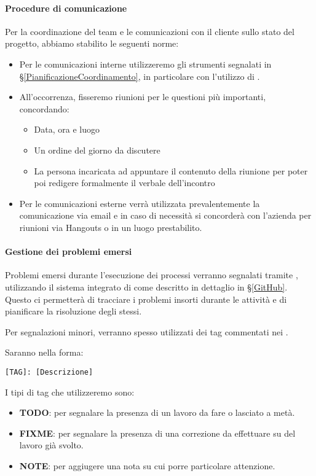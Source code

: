 			\paragraph{Procedure di comunicazione}
			Per la coordinazione del team e le comunicazioni con il cliente sullo stato del progetto, abbiamo stabilito le seguenti norme:
			\begin{itemize}
				\item Per le comunicazioni interne utilizzeremo gli strumenti segnalati in \S\ref{PianificazioneCoordinamento},
					in particolare con l'utilizzo di .
				\item All'occorrenza, fisseremo riunioni per le questioni più importanti, concordando:
					\begin{itemize}
						\item Data, ora e luogo
						\item Un ordine del giorno da discutere
						\item La persona incaricata ad appuntare il contenuto della riunione per poter poi redigere formalmente il verbale dell'incontro
					\end{itemize}
				\item Per le comunicazioni esterne verrà utilizzata prevalentemente la comunicazione via email e in caso di necessità si concorderà con
				l'azienda per riunioni via Hangouts o in un luogo prestabilito. %
			\end{itemize}


    		\paragraph{Gestione dei problemi emersi}
			Problemi emersi durante l'esecuzione dei processi verranno segnalati tramite , utilizzando il sistema integrato di
			 come descritto in dettaglio in \S\ref{GitHub}. Questo ci permetterà di tracciare i problemi insorti durante le attività
			e di pianificare la risoluzione degli stessi.\par
			Per segnalazioni minori, verranno spesso utilizzati dei tag commentati nei .
			\begin{samepage}
				Saranno nella forma:
				\begin{center}
					\texttt{[TAG]: [Descrizione]}
				\end{center}
			\end{samepage}
			I tipi di tag che utilizzeremo sono:
			\begin{itemize}
				\item \textbf{TODO}: per segnalare la presenza di un lavoro da fare o lasciato a metà.
				\item \textbf{FIXME}: per segnalare la presenza di una correzione da effettuare su del lavoro già svolto.
				\item \textbf{NOTE}: per aggiugere una nota su cui porre particolare attenzione.
			\end{itemize}
		
